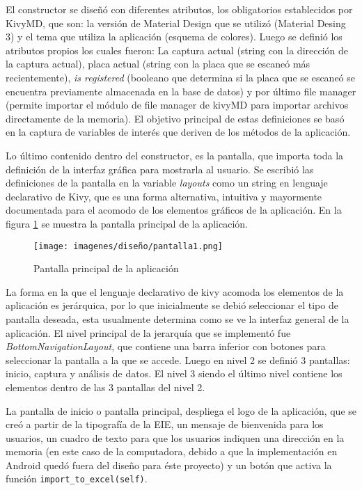  \par
 El constructor se diseñó con diferentes atributos, los obligatorios establecidos por KivyMD, que son: la versión de Material Design que se utilizó (Material Desing 3) y el tema que utiliza la aplicación (esquema de colores). Luego se definió los atributos propios los cuales fueron: La captura actual (string con la dirección de la captura actual), placa actual (string con la placa que se escaneó más recientemente), \textit{is registered} (booleano que determina si la placa que se escaneó se encuentra previamente almacenada en la base de datos) y por último file manager (permite importar el módulo de file manager de kivyMD para importar archivos directamente de la memoria). El objetivo principal de estas definiciones se basó en la captura de variables de interés que deriven de los métodos de la aplicación.
 \par
 Lo último contenido dentro del constructor, es la pantalla, que importa toda la definición de la interfaz gráfica para mostrarla al usuario. Se escribió las definiciones de la pantalla en la variable \textit{layouts} como un string en lenguaje declarativo de Kivy, que es una forma alternativa, intuitiva y mayormente documentada para el acomodo de los elementos gráficos de la aplicación. En la figura \ref{screen1} se muestra la pantalla principal de la aplicación.
\begin{figure}[h!]
    \centering
    \texttt{[image: imagenes/diseño/pantalla1.png]}
    \caption{Pantalla principal de la aplicación}
    \label{screen1}
\end{figure}
\par
La forma en la que el lenguaje declarativo de kivy acomoda los elementos de la aplicación es jerárquica, por lo que inicialmente se debió seleccionar el tipo de pantalla deseada, esta usualmente determina como se ve la interfaz general de la aplicación. El nivel principal de la jerarquía que se implementó fue \textit{BottomNavigationLayout}, que contiene una barra inferior con botones para seleccionar la pantalla a la que se accede. Luego en nivel 2 se definió 3 pantallas: inicio, captura y análisis de datos. El nivel 3 siendo el último nivel contiene los elementos dentro de las 3 pantallas del nivel 2.
\par
La pantalla de inicio o pantalla principal, despliega el logo de la aplicación, que se creó a partir de la tipografía de la EIE, un mensaje de bienvenida para los usuarios, un cuadro de texto para que los usuarios indiquen una dirección en la memoria (en este caso de la computadora, debido a que la implementación en Android quedó fuera del diseño para éste proyecto) y un botón que activa la función \verb|import_to_excel(self)|.
